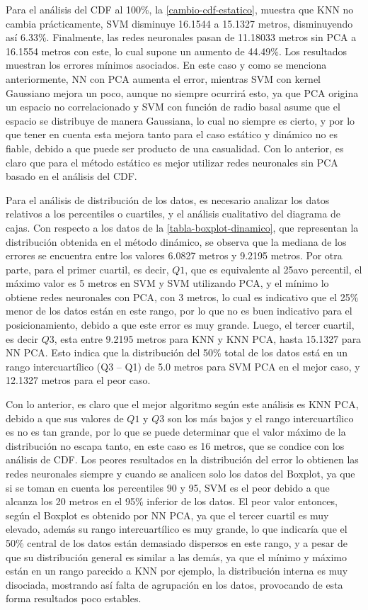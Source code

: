 Para el análisis del CDF al 100\%, la \autoref{cambio-cdf-estatico}, muestra que KNN no cambia prácticamente, SVM disminuye 16.1544 a 15.1327 metros, disminuyendo así 6.33\%. Finalmente, las redes neuronales pasan de 11.18033 metros sin PCA a 16.1554 metros con este, lo cual supone un aumento de 44.49\%.  Los resultados muestran los errores mínimos asociados. En este caso y como se menciona anteriormente, NN con PCA aumenta el error, mientras SVM con kernel Gaussiano mejora un poco, aunque no siempre ocurrirá esto, ya que PCA origina un espacio no correlacionado y SVM con función de radio basal asume que el espacio se distribuye de manera Gaussiana, lo cual no siempre es cierto, y por lo que tener en cuenta esta mejora tanto para el caso estático y dinámico no es fiable, debido a que puede ser producto de una casualidad. Con lo anterior, es claro que para el método estático es mejor utilizar redes neuronales sin PCA basado en el análisis del CDF.

Para el análisis de distribución de los datos, es necesario analizar los datos relativos a los percentiles o cuartiles, y el análisis cualitativo del diagrama de cajas.  Con respecto a los datos de la \autoref{tabla-boxplot-dinamico}, que representan la distribución obtenida en el método dinámico, se observa que la mediana de los errores se encuentra entre los valores 6.0827 metros y 9.2195 metros. Por otra parte, para el primer cuartil, es decir, $Q1$, que es equivalente al 25avo percentil, el máximo valor es 5 metros en SVM y SVM utilizando PCA, y el mínimo lo obtiene redes neuronales con PCA, con 3 metros, lo cual es indicativo que el 25\% menor de los datos están en este rango, por lo que no es buen indicativo para el posicionamiento, debido a que este error es muy grande. Luego, el tercer cuartil, es decir $Q3$, esta entre 9.2195 metros para KNN y KNN PCA, hasta 15.1327 para NN PCA. Esto indica que la distribución del 50\% total de los datos está en un rango intercuartílico (Q3 – Q1) de 5.0 metros para SVM PCA en el mejor caso, y 12.1327 metros para el peor caso. 

Con lo anterior, es claro que el mejor algoritmo según este análisis es KNN PCA, debido a que sus valores de $Q1$ y $Q3$ son los más bajos y el rango intercuartílico es no es tan grande, por lo que se puede determinar que el valor máximo de la distribución no escapa tanto, en este caso es 16 metros, que se condice con los análisis de CDF. Los peores resultados en la distribución del error lo obtienen las redes neuronales siempre y cuando se analicen solo los datos del Boxplot, ya que si se toman en cuenta los percentiles 90 y 95, SVM es el peor debido a que alcanza los 20 metros en el 95\% inferior de los datos. El peor valor entonces, según el Boxplot es obtenido por NN PCA, ya que el tercer cuartil es muy elevado, además su rango intercuartílico es muy grande, lo que indicaría que el 50\% central de los datos están demasiado dispersos en este rango, y a pesar de que su distribución general es similar a las demás, ya que el mínimo y máximo están en un rango parecido a KNN por ejemplo, la distribución interna es muy disociada, mostrando así falta de agrupación en los datos, provocando de esta forma resultados poco estables.

